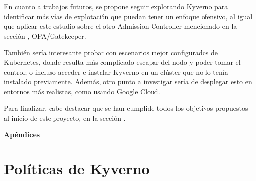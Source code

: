 \documentclass[12pt,twoside,titlepage]{report}
\newcommand\blankpage{%
    \newpage
    \null
    \thispagestyle{empty}%
    \newpage}
\begin{document}
En cuanto a trabajos futuros, se propone seguir explorando Kyverno para identificar más vías de explotación que puedan tener un enfoque ofensivo, al igual que aplicar este estudio sobre el otro Admission Controller mencionado en la sección , OPA/Gatekeeper.

También sería interesante probar con escenarios mejor configurados de Kubernetes, donde resulta más complicado escapar del nodo y poder tomar el control; o incluso acceder e instalar Kyverno en un clúster que no lo tenía instalado previamente. Además, otro punto a investigar sería de desplegar esto en entornos más realistas, como usando Google Cloud.

Para finalizar, cabe destacar que se han cumplido todos los objetivos propuestos al inicio de este proyecto, en la sección .


\blankpage










{}

\footnotesize{
%


}



\raggedbottom
\afterpage{\blankpage}

\newpage





\appendix

{}

\mbox{}
\vfill
\begin{center}
\begin{Huge}
\textbf{Apéndices}
\end{Huge}
\end{center}
\vfill
\mbox{}
\thispagestyle{empty}

\newpage
\mbox{}
\thispagestyle{empty}
\newpage


\chapter{Políticas de Kyverno}
\label{sec:apendice1}
\end{document}
